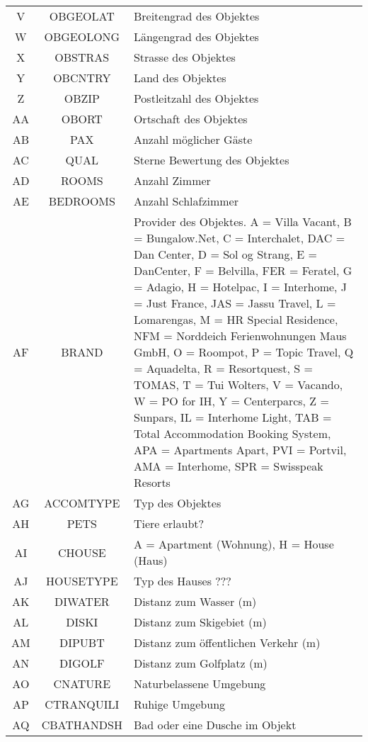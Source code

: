 \begin{longtable}{ | c | c | L{10cm} |}
	 \\ \hline
	V & OBGEOLAT & Breitengrad des Objektes \\ \hline 
	W & OBGEOLONG & Längengrad des Objektes \\ \hline 
	X & OBSTRAS & Strasse des Objektes \\ \hline 
	Y & OBCNTRY & Land des Objektes \\ \hline 
	Z & OBZIP & Postleitzahl des Objektes \\ \hline 
	AA & OBORT & Ortschaft des Objektes \\ \hline 
	AB & PAX & Anzahl möglicher Gäste \\ \hline 
	AC & QUAL & Sterne Bewertung des Objektes \\ \hline 
	AD & ROOMS & Anzahl Zimmer \\ \hline 
	AE & BEDROOMS & Anzahl Schlafzimmer \\ \hline 
	AF & BRAND & Provider des Objektes. A = Villa Vacant, B = Bungalow.Net, C = Interchalet, DAC = Dan Center, D = Sol og Strang, E = DanCenter, F = Belvilla, FER = Feratel, G = Adagio, H = Hotelpac, I = Interhome, J = Just France, JAS = Jassu Travel, L = Lomarengas, M = HR Special Residence, NFM = Norddeich Ferienwohnungen Maus GmbH, O = Roompot, P = Topic Travel, Q = Aquadelta, R = Resortquest, S = TOMAS, T = Tui Wolters, V = Vacando, W = PO for IH, Y = Centerparcs, Z = Sunpars, IL = Interhome Light, TAB = Total Accommodation Booking System, APA = Apartments Apart, PVI = Portvil, AMA = Interhome, SPR = Swisspeak Resorts\\ \hline 
	AG & ACCOMTYPE & Typ des Objektes\\ \hline 
	AH & PETS & Tiere erlaubt? \\ \hline 
	AI & CHOUSE & A = Apartment (Wohnung), H = House (Haus) \\ \hline 
	AJ & HOUSETYPE & Typ des Hauses ??? \\ \hline 
	AK & DIWATER & Distanz zum Wasser (m) \\ \hline 
	AL & DISKI & Distanz zum Skigebiet (m) \\ \hline 
	AM & DIPUBT & Distanz zum öffentlichen Verkehr (m) \\ \hline 
	AN & DIGOLF & Distanz zum Golfplatz (m) \\ \hline 
	AO & CNATURE & Naturbelassene Umgebung \\ \hline 
	AP & CTRANQUILI & Ruhige Umgebung \\ \hline 
	AQ & CBATHANDSH & Bad oder eine Dusche im Objekt \\ \hline 

\end{longtable}
